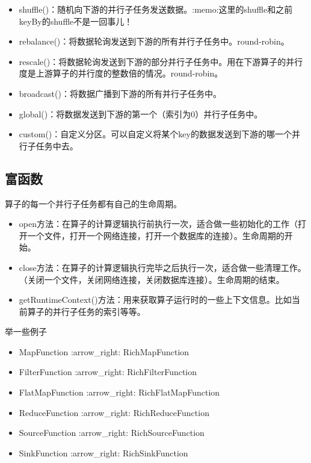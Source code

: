 \begin{itemize}
\tightlist
\item
  shuffle()：随机向下游的并行子任务发送数据。:memo:这里的shuffle和之前keyBy的shuffle不是一回事儿！
\item
  rebalance()：将数据轮询发送到下游的{所有}并行子任务中。round-robin。
\item
  rescale()：将数据轮询发送到下游的{部分}并行子任务中。用在下游算子的并行度是上游算子的并行度的整数倍的情况。round-robin。
\item
  broadcast()：将数据广播到下游的所有并行子任务中。
\item
  global()：将数据发送到下游的第一个（索引为0）并行子任务中。
\item
  custom()：自定义分区。可以自定义将某个key的数据发送到下游的哪一个并行子任务中去。
\end{itemize}

\hypertarget{ux5bccux51fdux6570}{%
\subsection{富函数}\label{ux5bccux51fdux6570}}

算子的每一个并行子任务都有自己的{生命周期}。

\begin{itemize}
\tightlist
\item
  open方法：在算子的计算逻辑执行前执行一次，适合做一些初始化的工作（打开一个文件，打开一个网络连接，打开一个数据库的连接）。生命周期的开始。
\item
  close方法：在算子的计算逻辑执行完毕之后执行一次，适合做一些清理工作。（关闭一个文件，关闭网络连接，关闭数据库连接）。生命周期的结束。
\item
  getRuntimeContext()方法：用来获取算子运行时的一些上下文信息。比如当前算子的并行子任务的索引等等。
\end{itemize}

举一些例子

\begin{itemize}
\tightlist
\item
  MapFunction :arrow\_right: RichMapFunction
\item
  FilterFunction :arrow\_right: RichFilterFunction
\item
  FlatMapFunction :arrow\_right: RichFlatMapFunction
\item
  ReduceFunction :arrow\_right: RichReduceFunction
\item
  SourceFunction :arrow\_right: RichSourceFunction
\item
  SinkFunction :arrow\_right: RichSinkFunction
\end{itemize}

